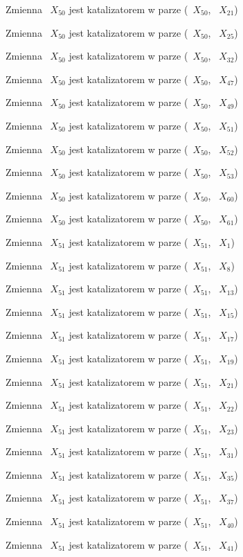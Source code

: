 \documentclass{article}
\begin{document}
Zmienna ~$X_{50}$ jest katalizatorem w parze (~$X_{50}$, ~$X_{21}$)

Zmienna ~$X_{50}$ jest katalizatorem w parze (~$X_{50}$, ~$X_{25}$)

Zmienna ~$X_{50}$ jest katalizatorem w parze (~$X_{50}$, ~$X_{32}$)

Zmienna ~$X_{50}$ jest katalizatorem w parze (~$X_{50}$, ~$X_{47}$)

Zmienna ~$X_{50}$ jest katalizatorem w parze (~$X_{50}$, ~$X_{49}$)

Zmienna ~$X_{50}$ jest katalizatorem w parze (~$X_{50}$, ~$X_{51}$)

Zmienna ~$X_{50}$ jest katalizatorem w parze (~$X_{50}$, ~$X_{52}$)

Zmienna ~$X_{50}$ jest katalizatorem w parze (~$X_{50}$, ~$X_{53}$)

Zmienna ~$X_{50}$ jest katalizatorem w parze (~$X_{50}$, ~$X_{60}$)

Zmienna ~$X_{50}$ jest katalizatorem w parze (~$X_{50}$, ~$X_{61}$)

Zmienna ~$X_{51}$ jest katalizatorem w parze (~$X_{51}$, ~$X_{1}$)

Zmienna ~$X_{51}$ jest katalizatorem w parze (~$X_{51}$, ~$X_{8}$)

Zmienna ~$X_{51}$ jest katalizatorem w parze (~$X_{51}$, ~$X_{13}$)

Zmienna ~$X_{51}$ jest katalizatorem w parze (~$X_{51}$, ~$X_{15}$)

Zmienna ~$X_{51}$ jest katalizatorem w parze (~$X_{51}$, ~$X_{17}$)

Zmienna ~$X_{51}$ jest katalizatorem w parze (~$X_{51}$, ~$X_{19}$)

Zmienna ~$X_{51}$ jest katalizatorem w parze (~$X_{51}$, ~$X_{21}$)

Zmienna ~$X_{51}$ jest katalizatorem w parze (~$X_{51}$, ~$X_{22}$)

Zmienna ~$X_{51}$ jest katalizatorem w parze (~$X_{51}$, ~$X_{23}$)

Zmienna ~$X_{51}$ jest katalizatorem w parze (~$X_{51}$, ~$X_{31}$)

Zmienna ~$X_{51}$ jest katalizatorem w parze (~$X_{51}$, ~$X_{35}$)

Zmienna ~$X_{51}$ jest katalizatorem w parze (~$X_{51}$, ~$X_{37}$)

Zmienna ~$X_{51}$ jest katalizatorem w parze (~$X_{51}$, ~$X_{40}$)

Zmienna ~$X_{51}$ jest katalizatorem w parze (~$X_{51}$, ~$X_{41}$)
\end{document}
